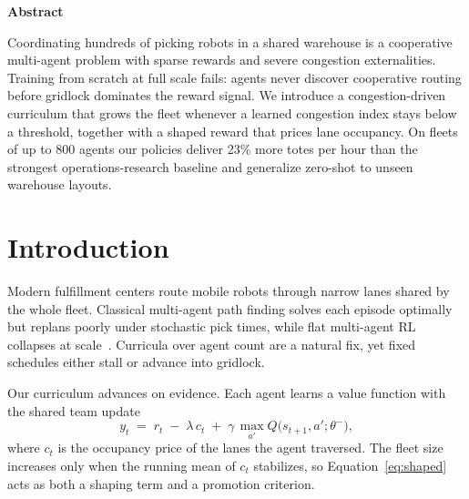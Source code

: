 \documentclass[10pt,twocolumn]{article}
\begin{document}
\thispagestyle{empty}

\begin{center}{\bfseries Abstract}\end{center}
\noindent Coordinating hundreds of picking robots in a shared warehouse is a
cooperative multi-agent problem with sparse rewards and severe congestion
externalities. Training from scratch at full scale fails: agents never
discover cooperative routing before gridlock dominates the reward signal. We
introduce a congestion-driven curriculum that grows the fleet whenever a
learned congestion index stays below a threshold, together with a shaped
reward that prices lane occupancy. On fleets of up to 800 agents our policies
deliver 23\% more totes per hour than the strongest operations-research
baseline and generalize zero-shot to unseen warehouse layouts.

\section{Introduction}
Modern fulfillment centers route mobile robots through narrow lanes shared by
the whole fleet. Classical multi-agent path finding solves each episode
optimally but replans poorly under stochastic pick times, while flat
multi-agent RL collapses at scale~\cite{brennan2023mapf}. Curricula over
agent count are a natural fix, yet fixed schedules either stall or advance
into gridlock.

Our curriculum advances on evidence. Each agent learns a value function with
the shared team update
\begin{equation}
  y_t \;=\; r_t \;-\; \lambda\, c_t \;+\; \gamma\, \max_{a'} Q\bigl(s_{t+1}, a'; \theta^{-}\bigr),
  \label{eq:shaped}
\end{equation}
where $c_t$ is the occupancy price of the lanes the agent traversed. The
fleet size increases only when the running mean of $c_t$ stabilizes, so
Equation~\eqref{eq:shaped} acts as both a shaping term and a promotion
criterion.
\end{document}

